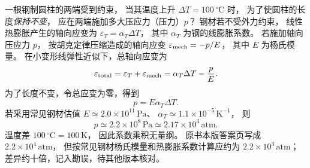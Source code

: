 
一根钢制圆柱的两端受到约束，
当其温度上升 $\Delta T=100\,^\circ\mathrm C$ 时，
为了使圆柱的长度\emph{保持不变}，
应在两端施加多大压应力（压力）$p$？
\exsolution
钢材若不受外力约束，
线性热膨胀产生的轴向应变为
$\varepsilon_T=\alpha_T\Delta T$，
其中 $\alpha_T$ 为钢的线膨胀系数。
若施加轴向压应力 $p$，
按胡克定律压缩造成的轴向应变
$\varepsilon_{\rm mech}=-p/E$，
其中 $E$ 为杨氏模量。
在小变形线弹性近似下，总轴向应变为
\[
\varepsilon_{\rm total}
=\varepsilon_T+\varepsilon_{\rm mech}
=\alpha_T\Delta T-\frac pE.
\]
为了长度不变，令总应变为零，得到
\[
\boxed{p=E\alpha_T\Delta T}.
\]
若采用常见钢材估值
$E\simeq2.0\times10^{11}\,\mathrm{Pa}$、
$\alpha_T\simeq1.1\times10^{-5}\,\mathrm{K^{-1}}$，
则
\[
\boxed{p\simeq2.2\times10^8\,\mathrm{Pa}
\simeq2.17\times10^3\,\mathrm{atm}}.
\]
\excheck 温度差
$100\,^\circ\mathrm C=100\,\mathrm K$，
因此系数乘积无量纲。
原书本版答案页写成
$2.2\times10^4\,\mathrm{atm}$，
但按常见钢材杨氏模量和热膨胀系数计算应约为
$2.2\times10^3\,\mathrm{atm}$；
差异约十倍，记入勘误，待其他版本核对。
